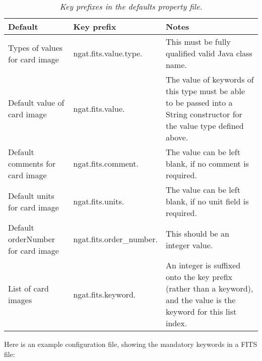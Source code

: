 \documentclass[10pt,a4paper]{article}
\begin{document}
\begin{table}
\begin{center}
\begin{tabular}{|p{12em}|l|p{20em}|}
\hline
{\bf Default} 			& {\bf Key prefix} 	& {\bf Notes} \\ \hline
Types of values for card image	& ngat.fits.value.type. & This must be fully qualified valid Java class name. \\ \hline
Default value of card image 	& ngat.fits.value. 	& The value of keywords of this type must be able to be 
					passed into a String constructor for the value type defined above. \\ \hline
Default comments for card image	& ngat.fits.comment. 	& The value can be left blank, 
							if no comment is required. \\ \hline
Default units for card image	& ngat.fits.units. 	& The value can be left blank, 
							if no unit field is required. \\ \hline
Default orderNumber for card image& ngat.fits.order\_number. & This should be an integer value. \\ \hline
List of card images		& ngat.fits.keyword.	&An integer is suffixed onto the key prefix 
							(rather than a keyword), 
							and the value is the keyword for this list index.\\ \hline
\end{tabular}
\end{center}
\caption{\em Key prefixes in the defaults property file.}
\label{tab:defaultkeyprefix} 
\end{table}

Here is an example configuration file, showing the mandatory keywords in a FITS file:
\end{document}
